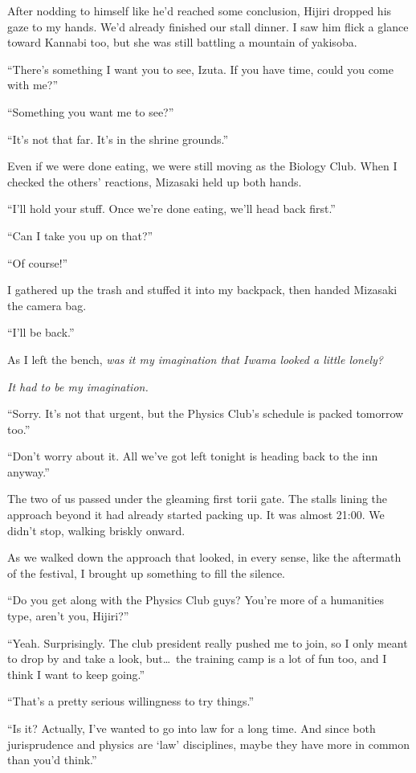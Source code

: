 \documentclass[
    a4paper,
    12pt,
    twoside,
    openany,
    UTF8,
    fontset=windows
]{ctexbook}
\begin{document}
After nodding to himself like he'd reached some conclusion, Hijiri dropped his gaze to my hands. We'd already finished our stall dinner. I saw him flick a glance toward Kannabi too, but she was still battling a mountain of yakisoba.

``There's something I want you to see, Izuta. If you have time, could you come with me?''

``Something you want me to see?''

``It's not that far. It's in the shrine grounds.''

Even if we were done eating, we were still moving as the Biology Club. When I checked the others' reactions, Mizasaki held up both hands.

``I'll hold your stuff. Once we're done eating, we'll head back first.''

``Can I take you up on that?''

``Of course!''

I gathered up the trash and stuffed it into my backpack, then handed Mizasaki the camera bag.

``I'll be back.''

As I left the bench, \textit{was it my imagination that Iwama looked a little lonely?}

\textit{It had to be my imagination.}

``Sorry. It's not that urgent, but the Physics Club's schedule is packed tomorrow too.''

``Don't worry about it. All we've got left tonight is heading back to the inn anyway.''

The two of us passed under the gleaming first torii gate. The stalls lining the approach beyond it had already started packing up. It was almost 21:00. We didn't stop, walking briskly onward.

As we walked down the approach that looked, in every sense, like the aftermath of the festival, I brought up something to fill the silence.

``Do you get along with the Physics Club guys? You're more of a humanities type, aren't you, Hijiri?''

``Yeah. Surprisingly. The club president really pushed me to join, so I only meant to drop by and take a look, but\dots\ the training camp is a lot of fun too, and I think I want to keep going.''

``That's a pretty serious willingness to try things.''

``Is it? Actually, I've wanted to go into law for a long time. And since both jurisprudence and physics are `law' disciplines, maybe they have more in common than you'd think.''
\end{document}
